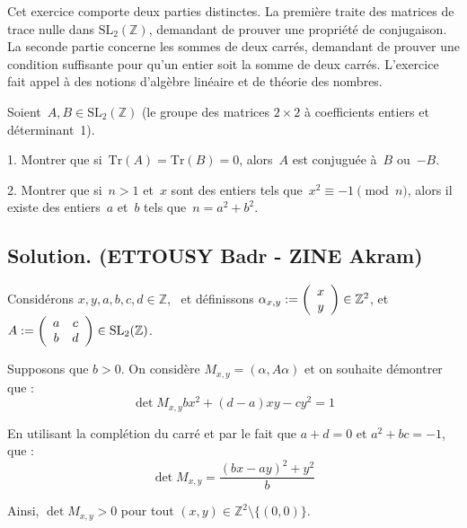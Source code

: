 Cet exercice comporte deux parties distinctes. La premi{\`e}re traite des
matrices de trace nulle dans $\mathrm{SL}_2 (\mathbb{Z})$, demandant de
prouver une propri{\'e}t{\'e} de conjugaison. La seconde partie concerne les
sommes de deux carr{\'e}s, demandant de prouver une condition suffisante pour
qu'un entier soit la somme de deux carr{\'e}s. L'exercice fait appel {\`a} des
notions d'alg{\`e}bre lin{\'e}aire et de th{\'e}orie des nombres.

\begin{exercise}
Soient~$A, B \in \mathrm{SL}_2 (\mathbb{Z})$ (le groupe des matrices $2 \times
2$ {\`a} coefficients entiers et d{\'e}terminant~1).

1. Montrer que si~$\mathrm{Tr} (A) = \mathrm{Tr} (B) = 0$, alors~$A$ est
conjugu{\'e}e {\`a}~$B$ ou~$- B$.

2. Montrer que si~$n > 1$ et~$x$ sont des entiers tels que~$x^2 \equiv - 1
\pmod{n}$, alors il existe des entiers~$a$ et~$b$ tels que~$n = a^2 + b^2$.

\end{exercise}

\subsection*{Solution. (ETTOUSY Badr - ZINE Akram)}


 Consid{\'e}rons $x, y, a, b, c, d \in \mathbb{Z}$, \ et
d{\'e}finissons $\alpha_{x, y} := \left(\begin{array}{c}
  x\\
  y
\end{array}\right) \in \mathbb{Z}^2$, et $A := \left(\begin{array}{cc}
  a & c\\
  b & d
\end{array}\right) \in \operatorname{SL}_2 (\mathbb{Z})$.

Supposons que $b > 0$. On consid{\`e}re $M_{x, y} = (\alpha, A \alpha)$ et on
souhaite d{\'e}montrer que :
\[ \det M_{x, y} bx^2 + (d - a) xy - cy^2 = 1 \]


En utilisant la compl{\'e}tion du carr{\'e} et par le fait que $a + d = 0$ et
$a^2 + bc = - 1$, que :
\[ \det M_{x, y} = \frac{(bx - ay)^2 + y^2}{b} \]


Ainsi, $\det M_{x, y} > 0$ pour tout $(x, y) \in \mathbb{Z}^2 \setminus \{(0,
0)\}$.

